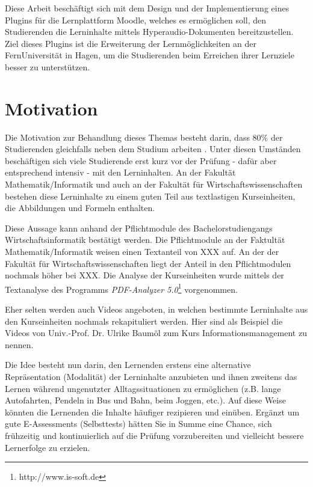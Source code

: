 
\label{cha:einfuehrung}
Diese Arbeit beschäftigt sich mit dem Design und der Implementierung eines Plugins für die Lernplattform Moodle, welches es ermöglichen soll, den Studierenden die Lerninhalte mittels Hyperaudio-Dokumenten bereitzustellen. Ziel dieses Plugins ist die Erweiterung der Lernmöglichkeiten an der FernUniversität in Hagen, um die Studierenden beim Erreichen ihrer Lernziele besser zu unterstützen. 


\section{Motivation}
\label{sec:motivation}
Die Motivation zur Behandlung dieses Themas besteht darin, dass 
80\% der Studierenden gleichfalls neben dem Studium arbeiten \citep{fernuniversitaet2018stat}. Unter diesen Umständen beschäftigen sich viele Studierende erst kurz vor der Prüfung - dafür aber entsprechend intensiv - mit den Lerninhalten. An der Fakultät Mathematik/Informatik und auch an der Fakultät für Wirtschaftswissenschaften bestehen diese Lerninhalte zu einem guten Teil aus textlastigen Kurseinheiten, die Abbildungen und Formeln enthalten.


Diese Aussage kann anhand der Pflichtmodule des Bachelorstudiengangs Wirtschaftsinformatik bestätigt werden.
Die Pflichtmodule an der Faktultät Mathematik/Informatik weisen einen Textanteil von XXX auf. An der der Fakultät für Wirtschaftswissenschaften liegt der Anteil in den Pflichtmodulen nochmals höher bei XXX. Die Analyse der Kurseinheiten wurde mittels der Textanalyse des Programms \textit{PDF-Analyzer 5.0}\footnote{http://www.is-soft.de} vorgenommen.

Eher selten werden auch Videos angeboten, in welchen bestimmte Lerninhalte aus den Kurseinheiten nochmals rekapituliert werden. Hier sind als Beispiel die Videos von Univ.-Prof. Dr. Ulrike Baumöl zum Kurs \glqq Informationsmanagement\grqq{} zu nennen.

Die Idee besteht nun darin, den Lernenden erstens eine alternative Repräsentation (Modalität) der Lerninhalte anzubieten und ihnen zweitens das Lernen während ungenutzter Alltagssituationen zu ermöglichen (z.B. lange Autofahrten, Pendeln in Bus und Bahn, beim Joggen, etc.). Auf diese Weise könnten die Lernenden die Inhalte häufiger rezipieren und einüben. Ergänzt um gute E-Assessments (Selbsttests) hätten Sie in Summe eine Chance, sich frühzeitig und kontinuierlich auf die Prüfung vorzubereiten und vielleicht bessere Lernerfolge zu erzielen. 


